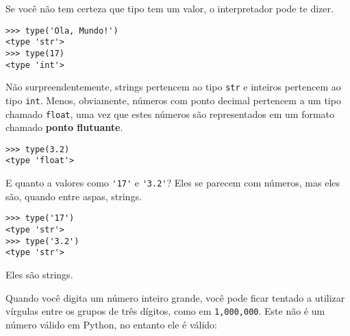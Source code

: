 Se você não tem certeza que tipo tem um valor, o interpretador pode te dizer.

\beforeverb
\begin{verbatim}
>>> type('Ola, Mundo!')
<type 'str'>
>>> type(17)
<type 'int'>
\end{verbatim}
\afterverb
% 

Não surpreendentemente, strings pertencem ao tipo {\tt str} e 
inteiros pertencem ao tipo {\tt int}. Menos, obviamente, números 
com ponto decimal pertencem a um tipo chamado {\tt float},
uma vez que estes números são representados em um formato 
chamado {\bf ponto flutuante}.


\beforeverb
\begin{verbatim}
>>> type(3.2)
<type 'float'>
\end{verbatim}
\afterverb

E quanto a valores como \verb"'17'" e \verb"'3.2'"?
Eles se parecem com números, mas eles são, quando entre aspas, 
strings.


\beforeverb
\begin{verbatim}
>>> type('17')
<type 'str'>
>>> type('3.2')
<type 'str'>
\end{verbatim}
\afterverb
%

Eles são strings.

Quando você digita um número inteiro grande, você pode ficar tentado a utilizar vírgulas 
entre os grupos de três dígitos, como em {\tt 1,000,000}. Este não é um 
número válido em Python, no entanto ele é válido:

